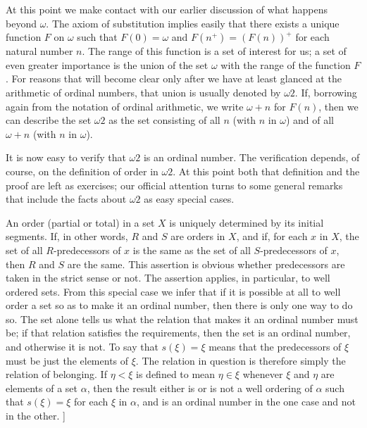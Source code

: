 At this point we make contact with our earlier discussion of what happens beyond $\omega$. The axiom of substitution implies easily that there exists a unique function $F$ on $\omega$ such that $F(0) = \omega$ and $F(n^{+}) = (F(n))^{+}$ for each natural number $n$. The range of this function is a set of interest for us; a set of even greater importance is the union of the set $\omega$ with the range of the function $F$. For reasons that will become clear only after we have at least glanced at the arithmetic of ordinal numbers, that union is usually denoted by $\omega 2$. If, borrowing again from the notation of ordinal arithmetic, we write $\omega + n$ for $F(n)$, then we can describe the set $\omega 2$ as the set consisting of all $n$ (with $n$ in $\omega$) and of all $\omega + n$ (with $n$ in $\omega$). 

It is now easy to verify that $\omega 2$ is an ordinal number. The verification depends, of course, on the definition of order in $\omega 2$. At this point both that definition and the proof are left as exercises; our official attention turns to some general remarks that include the facts about $\omega 2$ as easy special cases. 

An order (partial or total) in a set $X$ is uniquely determined by its initial segments. If, in other words, $R$ and $S$ are orders in $X$, and if, for each $x$ in $X$, the set of all $R$-predecessors of $x$ is the same as the set of all $S$-predecessors of $x$, then $R$ and $S$ are the same. This assertion is   obvious whether predecessors are taken in the strict sense or not. The assertion applies, in particular, to well ordered sets. From this special case we infer that if it is possible at all to well order a set so as to make it an ordinal number, then there is only one way to do so. The set alone tells us what the relation that makes it an ordinal number must be; if that relation satisfies the requirements, then the set is an ordinal number, and otherwise it is not. To say that $s( \xi ) = \xi $ means that the predecessors of $\xi$ must be just the elements of $\xi$. The relation in question is therefore simply the relation of belonging. If $\eta <  \xi$ is defined to mean $\eta \in \xi$ whenever $\xi$ and $\eta$ are elements of a set $\alpha$, then the result either is or is not a well ordering of $\alpha$ such that $s( \xi ) = \xi$ for each $\xi$ in $\alpha$, and is an ordinal number in the one case and not in the other. ]

